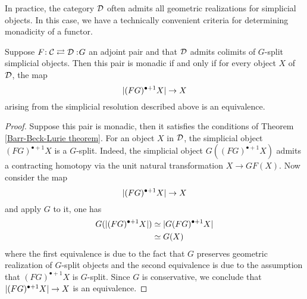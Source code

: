 In practice, the category ${\mathcal{D}}$ often admits all geometric realizations for simplicial objects. In this case, we have a technically convenient criteria for determining monadicity of a functor.
\begin{corollary}
\label{Cor of Barr-Beck-Lurie theorem}
Suppose $F\negmedspace: {\mathcal{C}}\rightleftarrows {\mathcal{D}}:\negmedspace G$ an adjoint pair and that ${\mathcal{D}}$ admits colimits of $G$-split simplicial objects. Then this pair is monadic if and only if for every object $X$ of ${\mathcal{D}}$, the map
$$
\lvert(FG)^{\bullet+1}X\rvert \to X
$$
arising from the simplicial resolution described above is an equivalence.
\end{corollary}
\begin{proof}
	Suppose this pair is monadic, then it satisfies the conditions of Theorem \ref{Barr-Beck-Lurie theorem}. For an object $X$ in ${\mathcal{D}}$, the simplicial object $(FG)^{\bullet+1}X$ is a $G$-split. Indeed, the simplicial object $G((FG)^{\bullet+1}X)$ admits a contracting homotopy via the unit natural transformation $X \to GF(X)$.
	Now consider the map 
	$$
	\lvert(FG)^{\bullet+1}X\rvert \to X
	$$
	and apply $G$ to it, one has
	\begin{align*}
		G(\lvert(FG)^{\bullet+1}X\rvert) & \simeq \lvert G(FG)^{\bullet+1}X\rvert\\
		& \simeq G(X)
	\end{align*}
	where the first equivalence is due to the fact that $G$ preserves geometric realization of $G$-split objects and the second equivalence is due to the assumption that $(FG)^{\bullet+1}X$ is $G$-split.  
	Since $G$ is conservative, we conclude that $\lvert(FG)^{\bullet+1}X\rvert \to X$ is an equivalence.
	

\end{proof}
